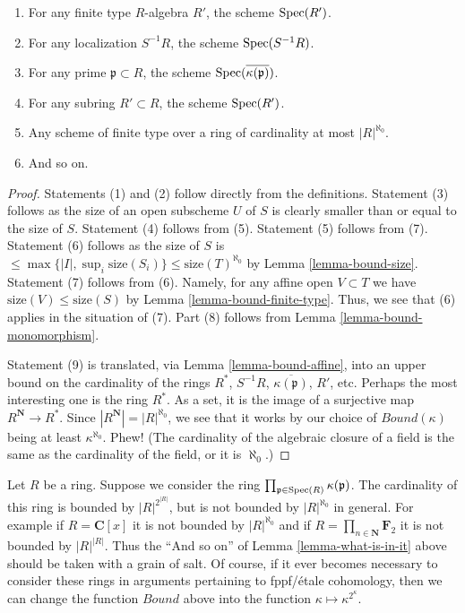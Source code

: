 \begin{lemma}
\begin{enumerate}
\begin{enumerate}
$R^* = \lim_n R/I^n$, the scheme $\Spec(R^*)$.
\item For any finite type $R$-algebra $R'$, the
scheme $\mathop{\mathrm{Spec}}(R')$.
\item For any localization $S^{-1}R$, the scheme $\mathop{\mathrm{Spec}}(S^{-1}R)$.
\item For any prime $\mathfrak p \subset R$, the scheme
$\mathop{\mathrm{Spec}}(\overline{\kappa(\mathfrak p)})$.
\item For any subring $R' \subset R$, the scheme
$\mathop{\mathrm{Spec}}(R')$.
\item Any scheme of finite type over a ring of cardinality at most
$|R|^{\aleph_0}$.
\item And so on.
\end{enumerate}
\end{enumerate}
\end{lemma}

\begin{proof}
Statements (1) and (2) follow directly from the definitions.
Statement (3) follows as the size of an open subscheme $U$ of $S$ is
clearly smaller than or equal to the size of $S$.
Statement (4) follows from (5).
Statement (5) follows from (7).
Statement (6) follows as the size of $S$ is
$\leq \max\{|I|, \sup_i \text{size}(S_i)\} \leq \text{size}(T)^{\aleph_0}$
by Lemma \ref{lemma-bound-size}. Statement (7) follows from (6).
Namely, for any affine open $V \subset T$ we have
$\text{size}(V) \leq \text{size}(S)$ by
Lemma \ref{lemma-bound-finite-type}.
Thus, we see that (6) applies in the situation of (7).
Part (8) follows from
Lemma \ref{lemma-bound-monomorphism}.

\medskip\noindent
Statement (9) is translated, via Lemma \ref{lemma-bound-affine},
into an upper bound on the cardinality of the rings
$R^*$, $S^{-1}R$, $\overline{\kappa(\mathfrak p)}$, $R'$, etc.
Perhaps the most interesting one is the ring $R^*$. As a
set, it is the image of a surjective map $R^{\mathbf{N}} \to R^*$.
Since $|R^{\mathbf{N}}| = |R|^{\aleph_0}$, we see that
it works by our choice of $Bound(\kappa)$ being at least $\kappa^{\aleph_0}$.
Phew! (The cardinality of the algebraic closure of a field
is the same as the cardinality of the field, or it is $\aleph_0$.)
\end{proof}

\begin{remark}
\label{remark-what-is-not-in-it}
Let $R$ be a ring. Suppose we consider the ring
$\prod_{\mathfrak p \in \mathop{\mathrm{Spec}}(R)} \kappa(\mathfrak p)$.
The cardinality of this ring is bounded by $|R|^{2^{|R|}}$,
but is not bounded by $|R|^{\aleph_0}$ in general.
For example if $R = \mathbf{C}[x]$ it is not bounded by
$|R|^{\aleph_0}$ and if $R = \prod_{n \in \mathbf{N}} \mathbf{F}_2$
it is not bounded by $|R|^{|R|}$.
Thus the ``And so on'' of Lemma \ref{lemma-what-is-in-it} above
should be taken with a grain of salt. Of course, if it ever becomes
necessary to consider these rings in arguments pertaining to
fppf/\'etale cohomology, then we can change the function
$Bound$ above into the function $\kappa \mapsto \kappa^{2^\kappa}$.
\end{remark}


